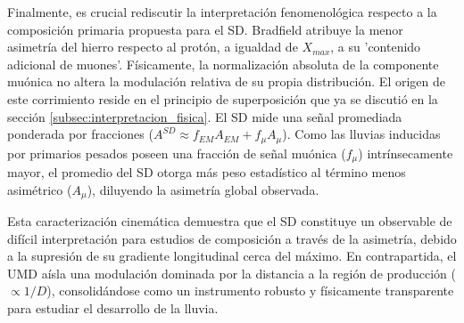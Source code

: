 Finalmente, es crucial rediscutir la interpretación fenomenológica respecto a la composición primaria propuesta para el SD. Bradfield atribuye la menor asimetría del hierro respecto al protón, a igualdad de $X_{max}$, a su 'contenido adicional de muones'. Físicamente, la normalización absoluta de la componente muónica no altera la modulación relativa de su propia distribución. El origen de este corrimiento reside en el principio de superposición que ya se discutió en la sección \ref{subsec:interpretacion_fisica}. El SD mide una señal promediada ponderada por fracciones ($A^{SD} \approx f_{EM} A_{EM} + f_{\mu} A_{\mu}$). Como las lluvias inducidas por primarios pesados poseen una fracción de señal muónica ($f_{\mu}$) intrínsecamente mayor, el promedio del SD otorga más peso estadístico al término menos asimétrico ($A_{\mu}$), diluyendo la asimetría global observada. 

Esta caracterización cinemática demuestra que el SD constituye un observable de difícil interpretación para estudios de composición a través de la asimetría, debido a la supresión de su gradiente longitudinal cerca del máximo. En contrapartida, el UMD aísla una modulación dominada por la distancia a la región de producción ($\propto 1/D$), consolidándose como un instrumento robusto y físicamente transparente para estudiar el desarrollo de la lluvia.

\newpage